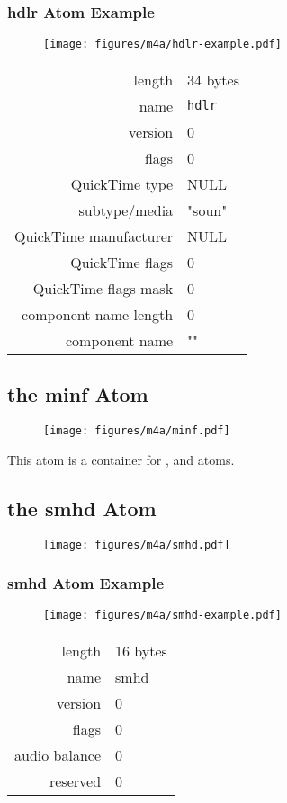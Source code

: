 \subsubsection{hdlr Atom Example}
\begin{figure}[h]
\texttt{[image: figures/m4a/hdlr-example.pdf]}
\end{figure}
\begin{tabular}{rl}
  \textsf{length} & 34 bytes \\
  \textsf{name} & \texttt{hdlr} \\
  \textsf{version} & 0 \\
  \textsf{flags} & 0 \\
  \textsf{QuickTime type} & NULL \\
  \textsf{subtype/media} & \textsf{"soun"} \\
  \textsf{QuickTime manufacturer} & NULL \\
  \textsf{QuickTime flags} & 0 \\
  \textsf{QuickTime flags mask} & 0 \\
  \textsf{component name length} & 0 \\
  \textsf{component name} & \textsf{""} \\
\end{tabular}

\clearpage

\subsection{the minf Atom}
\label{atom:minf}
\begin{figure}[h]
  \texttt{[image: figures/m4a/minf.pdf]}
\end{figure}
\par
\noindent
This atom is a container for \hyperref[atom:smhd]{},
\hyperref[atom:dinf]{} and
\hyperref[atom:stbl]{} atoms.

\subsection{the smhd Atom}
\label{atom:smhd}
\begin{figure}[h]
  \texttt{[image: figures/m4a/smhd.pdf]}
\end{figure}

\subsubsection{smhd Atom Example}
\begin{figure}[h]
  \texttt{[image: figures/m4a/smhd-example.pdf]}
\end{figure}
\begin{tabular}{rl}
  \textsf{length} & 16 bytes \\
  \textsf{name} & \textsf{smhd} \\
  \textsf{version} & 0 \\
  \textsf{flags} & 0 \\
  \textsf{audio balance} & 0 \\
  \textsf{reserved} & 0 \\
\end{tabular}

